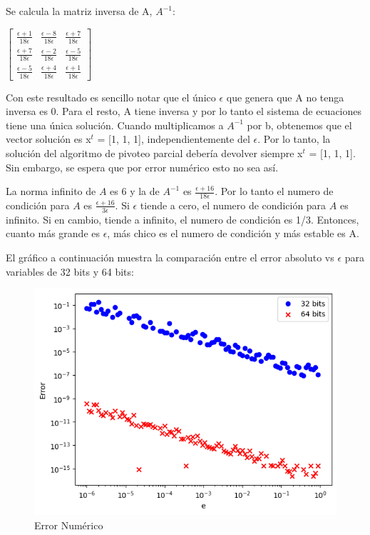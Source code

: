 Se calcula la matriz inversa de A, $A^{-1}$:
\begin{center}
$\begin{bmatrix}
\frac{\epsilon+1}{18\epsilon} & \frac{\epsilon-8}{18\epsilon} & \frac{\epsilon+7}{18\epsilon}\\
\frac{\epsilon+7}{18\epsilon} & \frac{\epsilon-2}{18\epsilon} & \frac{\epsilon-5}{18\epsilon}\\
\frac{\epsilon-5}{18\epsilon} & \frac{\epsilon+4}{18\epsilon} & \frac{\epsilon+1}{18\epsilon}
\end{bmatrix}$
\end{center}

Con este resultado es sencillo notar que el único $\epsilon$ que genera que A no tenga inversa es 0. Para el resto, A tiene inversa y por lo tanto el sistema de ecuaciones tiene una única solución. Cuando multiplicamos a $A^{-1}$ por b, obtenemos que el vector solución es x$^t$ = [1, 1, 1], independientemente del $\epsilon$. Por lo tanto, la solución del algoritmo de pivoteo parcial debería devolver siempre x$^t$ = [1, 1, 1]. Sin embargo, se espera que por error numérico esto no sea así. 

La norma infinito de $A$ es 6 y la de $A^{-1}$ es $\frac{\epsilon+16}{18\epsilon}$. Por lo tanto el numero de condición para $A$ es $\frac{\epsilon+16}{3\epsilon}$. Si $\epsilon$ tiende a cero, el numero de condición para $A$ es infinito. Si en cambio, tiende a infinito, el numero de condición es 1/3. Entonces, cuanto más grande es $\epsilon$, más chico es el numero de condición y más estable es A. 

El gráfico a continuación muestra la comparación entre el error absoluto vs $\epsilon$ para variables de 32 bits y 64 bits:

\begin{figure}[htbp]
\centerline{\includegraphics[scale=0.50]{./img/error_numerico_32vs64.png}}
\caption{Error Numérico}
\label{result_errorNumerico}
\end{figure}

